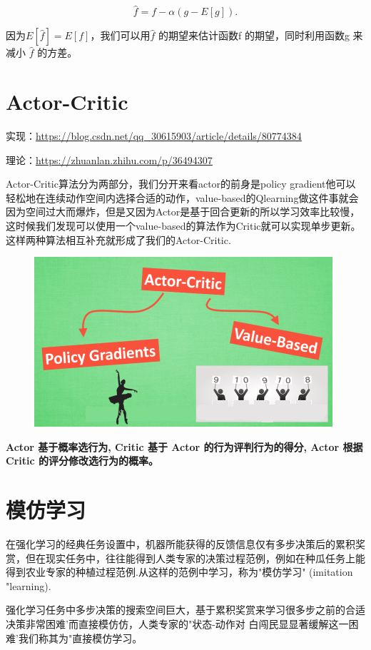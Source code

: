 \documentclass[UTF8,a4paper,12pt]{ctexbook}
\begin{document}
			$$\hat{f} = f - \alpha(g - E[g]).$$
			
			因为$E[\hat{f}] = E[f]$，我们可以用$\hat{f}$ 的期望来估计函数f 的期望，同时利用函数g 来减小 $\hat{f}$ 的方差。
			
	\section{Actor-Critic}
		实现：\url{https://blog.csdn.net/qq_30615903/article/details/80774384}
		
		理论：\url{https://zhuanlan.zhihu.com/p/36494307}
		
		
		Actor-Critic算法分为两部分，我们分开来看actor的前身是policy gradient他可以轻松地在连续动作空间内选择合适的动作，value-based的Qlearning做这件事就会因为空间过大而爆炸，但是又因为Actor是基于回合更新的所以学习效率比较慢，这时候我们发现可以使用一个value-based的算法作为Critic就可以实现单步更新。这样两种算法相互补充就形成了我们的Actor-Critic.

		\begin{figure}[H]
			\centering
			\includegraphics[width=.9\linewidth]{Actor-Critic}
		\end{figure}
		
		\textbf{Actor 基于概率选行为, Critic 基于 Actor 的行为评判行为的得分, Actor 根据 Critic 的评分修改选行为的概率。}
		
		
	\section{模仿学习}
		在强化学习的经典任务设置中，机器所能获得的反馈信息仅有多步决策后的累积奖赏，但在现实任务中，往往能得到人类专家的决策过程范例，例如在种瓜任务上能得到农业专家的种植过程范例.从这样的范例中学习，称为"模仿学习" (imitation "learning).	
		
		强化学习任务中多步决策的搜索空间巨大，基于累积奖赏来学习很多步之前的合适决策非常困难'而直接模仿仿，人类专家的"状态-动作对 白闯民显显著缓解这一困难'我们称其为"直接模仿学习。
		
\end{document}
